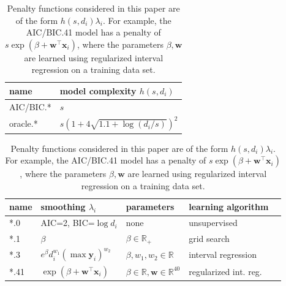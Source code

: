 \documentclass{article}
\newcommand{\RR}{\mathbb R}
\begin{document}
\begin{table}[b!]

  \begin{minipage}{0.4\textwidth}
  \begin{tabular}{ll}
    \textbf{name} & \textbf{model complexity} $h(s, d_i)$ \\
    \hline
    AIC/BIC.* & $s$\\
    oracle.* & $s\left(1 + 4\sqrt{1.1 + \log(d_i/s)}\right)^2$
  \end{tabular}
  \end{minipage}
  \begin{minipage}{0.5\textwidth}
  \begin{tabular}{lllll}
    \textbf{name} & \textbf{smoothing} $\lambda_i$ & 
    \textbf{parameters} & \textbf{learning algorithm} \\
    \hline
    *.0 & AIC=2, BIC=$\log d_i$ & none & unsupervised \\
    *.1 & 
    $\beta$ & 
    $\beta\in\RR_+$ & grid search \\
    *.3 & 
    $e^\beta d_i^{w_1} (\max \mathbf y_i)^{w_{2}}$ & 
    $\beta, w_1, w_{2}\in\RR$ & interval regression \\
    *.41 & 
    $\exp(\beta + \mathbf w^\intercal \mathbf x_i)$ & 
    $\beta\in\RR, \mathbf w\in\RR^{40}$ & 
    regularized int. reg. \\
  \end{tabular}
  \end{minipage}

  \caption{Penalty functions considered in this paper are of the form
    $h(s, d_i) \lambda_i $.
    For example, the AIC/BIC.41 model has a penalty of
    $s \exp(\beta + \mathbf w^\intercal \mathbf x_i)$, 
    where the parameters $\beta,\mathbf w$ 
    are learned using regularized interval regression 
    on a training data set.
  }
  \label{tab:penalties}
\end{table}
\end{document}
